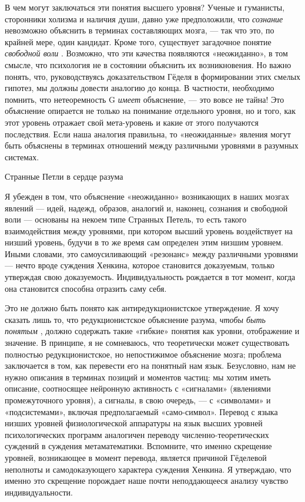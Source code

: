 В чем могут заключаться эти понятия высшего уровня? Ученые и гуманисты, сторонники холизма и наличия души, давно уже предположили, что \emph{сознание} невозможно объяснить в терминах составляющих мозга, --- так что это, по крайней мере, один кандидат. Кроме того, существует загадочное понятие \emph{свободной воли} . Возможно, что эти качества появляются «неожиданно», в том смысле, что психология не в состоянии объяснить их возникновения. Но важно понять, что, руководствуясь доказательством Гёделя в формировании этих смелых гипотез, мы должны довести аналогию до конца. В частности, необходимо помнить, что нетеоремность G \emph{имеет} объяснение, --- это вовсе не тайна! Это объяснение опирается не только на понимание отдельного уровня, но и того, как этот уровень отражает свой мета-уровень и какие от этого получаются последствия. Если наша аналогия правильна, то «неожиданные» явления могут быть объяснены в терминах отношений между различными уровнями в разумных системах.

Странные Петли в сердце разума

Я убежден в том, что объяснение «неожиданно» возникающих в наших мозгах явлений --- идей, надежд, образов, аналогий и, наконец, сознания и свободной воли --- основаны на некоем типе Странных Петель, то есть такого взаимодействия между уровнями, при котором высший уровень воздействует на низший уровень, будучи в то же время сам определен этим низшим уровнем. Иными словами, это самоусиливающий «резонанс» между различными уровнями --- нечто вроде суждения Хенкина, которое становится доказуемым, только утверждая свою доказуемость. Индивидуальность рождается в тот момент, когда она становится способна отразить саму себя.

Это не должно быть понято как антиредукционистское утверждение. Я хочу сказать лишь то, что редукционистское объяснение разума, \emph{чтобы быть понятым} , должно содержать такие «гибкие» понятия как уровни, отображение и значение. В принципе, я не сомневаюсь, что теоретически может существовать полностью редукционистское, но непостижимое объяснение мозга; проблема заключается в том, как перевести его на понятный нам язык. Безусловно, нам не нужно описания в терминах позиций и моментов частиц: мы хотим иметь описание, соотносящее нейронную активность с «сигналами» (явлениями промежуточного уровня), а сигналы, в свою очередь, --- с «символами» и «подсистемами», включая предполагаемый «само-символ». Перевод с языка низших уровней физиологической аппаратуры на язык высших уровней психологических программ аналогичен переводу численно-теоретических суждений в суждения метаматематики. Вспомните, что именно скрещение уровней, возникающее в момент перевода, является причиной Гёделевой неполноты и самодоказующего характера суждения Хенкина. Я утверждаю, что именно это скрещение порождает наше почти неподдающееся анализу чувство индивидуальности.

